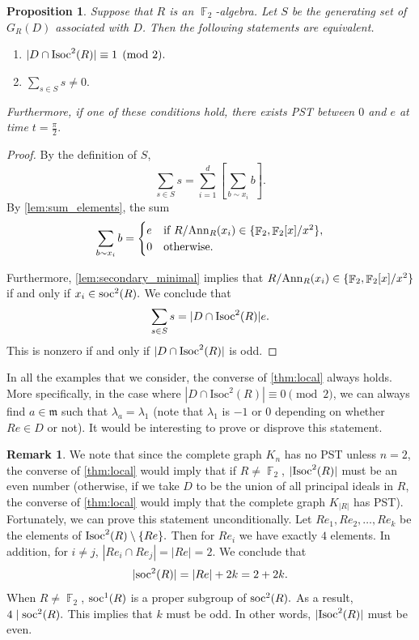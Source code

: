\documentclass[12pt, a4paper]{amsart}
\newtheorem{prop}[thm]{Proposition}
\theoremstyle{definition}
\newtheorem{rem}[thm]{Remark}
\DeclareMathOperator{\F}{\mathbb{F}}
\newcommand{\Ann}{{\rm Ann}}
\numberwithin{equation}{section}
\newcommand{\soc}{{{\rm soc}}}
\newcommand{\Isoc}{{{\rm Isoc}}}
\begin{document}
\begin{prop}
    Suppose that $R$ is an $\F_2$-algebra. Let $S$ be the generating set of $G_R(D)$ associated with $D$. Then the following statements are equivalent.
    \begin{enumerate}
        \item $|D \cap {\Isoc}^2(R)| \equiv 1 \pmod{2}.$
        \item $\sum_{s \in S} s \neq 0.$
    \end{enumerate}
    Furthermore, if one of these conditions hold, there exists PST between $0$ and $e$ at time $t=\frac{\pi}{2}.$
\end{prop}

\begin{proof}
By the definition of $S$,
\[ \sum_{s \in S} s = \sum_{i=1}^d \left[\sum_{b \sim x_i} b  \right]. \]
By \cref{lem:sum_elements}, the sum 
\[ \sum_{b \sim x_i} b = 
\begin{cases}
e & \text{if } R/\Ann_{R}(x_i) \in \{\F_2, \F_2[x]/x^2\}, \\
0 & \text{otherwise. } 
\end{cases} 
\]     

Furthermore, \cref{lem:secondary_minimal} implies that $R/\Ann_{R}(x_i) \in \{\F_2, \F_2[x]/x^2\}$ if and only if $x_i \in \soc^2(R).$ We conclude that 
\[ \sum_{s \in S} s = |D \cap \Isoc^2(R)|e. \] 
This is nonzero if and only if $|D \cap \Isoc^2(R)|$ is odd. 
\end{proof}


In all the examples that we consider, the converse of \cref{thm:local} always holds. More specifically, in the case where $|D \cap \text{Isoc}^2(R)| \equiv 0 \pmod{2}$, we can always find $a \in \mathfrak{m}$ such that $\lambda_a = \lambda_1$ (note that $\lambda_1$ is $-1$ or $0$ depending on whether $Re \in D$ or not). It would be interesting to prove or disprove this statement.

\begin{rem}

We note that since the complete graph $K_n$ has no PST unless $n=2$, the converse of \cref{thm:local} would imply that if $R \neq \F_2$, $|\Isoc^2(R)|$ must be an even number (otherwise, if we take $D$ to be the union of all principal ideals in $R$, the converse of \cref{thm:local} would imply that the complete graph $K_{|R|}$ has PST). Fortunately, we can prove this statement unconditionally. Let $Re_1, Re_2, \ldots, Re_k$ be the elements of $\Isoc^2(R)\setminus \{Re\}.$ Then for $Re_i$ we have exactly $4$ elements. In addition, for $i \neq j$, $|Re_i \cap Re_j| = |Re|=2$. We conclude that 
\[ |\soc^2(R)| = |Re|  + 2k = 2+2k. \]
When $R \neq \F_2$, $\soc^{1}(R)$ is a proper subgroup of $\soc^2(R).$ As a result, $4 \mid \soc^2(R).$ This implies that $k$ must be odd. In other words, $|\Isoc^2(R)|$ must be even.  
\end{rem}
\iffalse
\end{document}
